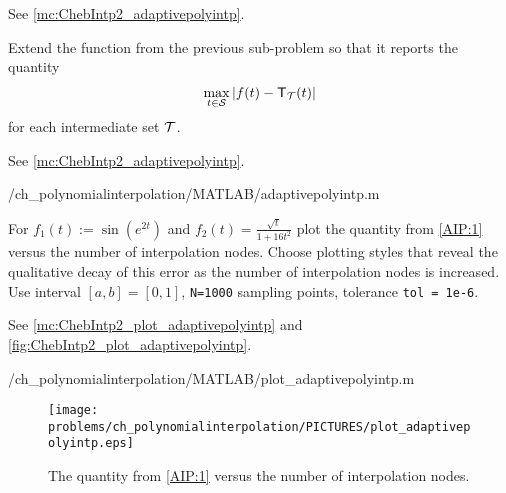 \begin{problem}
\begin{subproblem}[3]
\begin{solution}
See \autoref{mc:ChebIntp2_adaptivepolyintp}.
\end{solution}
\end{subproblem}


\begin{subproblem}[2]\label{subprb:ChebIntp2_2}
Extend the function from the previous sub-problem so that it
reports the quantity 
\begin{gather}
\label{AIP:1}
\operatorname*{max}\limits_{t\in\Cs}
|f(t)-\Op{T}_{\Ct}(t)| %
\end{gather}
for each intermediate set ${\cal T}$. 

\begin{solution}
See \autoref{mc:ChebIntp2_adaptivepolyintp}.
%

{\problems/ch_polynomialinterpolation/MATLAB/adaptivepolyintp.m}
\end{solution}
\end{subproblem}


\begin{subproblem}[2]\label{subprb:ChebIntp2_3} 
For $f_{1}(t) :=
\sin(e^{2t})$ and $f_{2}(t) = \frac{\sqrt{t}}{1+16t^{2}}$ plot the quantity from
\eqref{AIP:1} versus the number of interpolation nodes. Choose plotting styles
that reveal the qualitative decay of this error as the number of interpolation
nodes is increased. Use interval $[a,b] = [0,1]$, \texttt{N=1000} sampling points,
tolerance \texttt{tol = 1e-6}.

\begin{solution}
See \autoref{mc:ChebIntp2_plot_adaptivepolyintp} and \autoref{fig:ChebIntp2_plot_adaptivepolyintp}.
%

{\problems/ch_polynomialinterpolation/MATLAB/plot_adaptivepolyintp.m}
%
\begin{figure}
\centering
\texttt{[image: \\problems/ch\_polynomialinterpolation/PICTURES/plot\_adaptivepolyintp.eps]}
\caption{The quantity from \eqref{AIP:1}
versus the number of interpolation nodes.}
\label{fig:ChebIntp2_plot_adaptivepolyintp}
\end{figure}
\end{solution}
\end{subproblem}
\end{problem}

